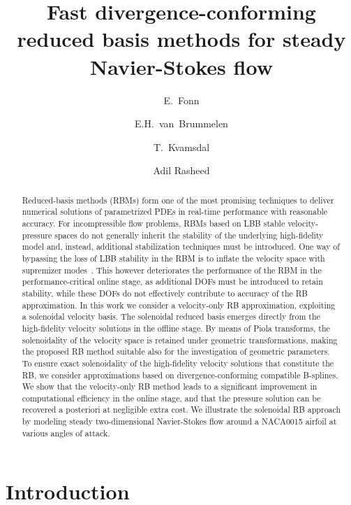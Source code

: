 \documentclass[onecolumn, twoside, a4paper, 11pt]{article}
\begin{document}
\title{Fast divergence-conforming reduced basis methods for steady Navier-Stokes flow}
\author[1]{E.~Fonn}
\author[2]{E.H.~van~Brummelen}
\author[1,3]{T.~Kvamsdal}
\author[1]{Adil Rasheed}

\maketitle

\begin{abstract}
  Reduced-basis methods (RBMs) form one of the most promising techniques to
  deliver numerical solutions of parametrized PDEs in real-time performance
  with reasonable accuracy. For incompressible flow problems, RBMs based on LBB
  stable velocity-pressure spaces do not generally inherit the stability
  of the underlying high-fidelity model and, instead, additional stabilization techniques
  must be introduced. One way of bypassing the loss of LBB stability in the RBM is to
  inflate the velocity space with supremizer modes~\cite{Ballarin2015ssp}. This however
  deteriorates the performance of the RBM in the performance-critical online stage, as
  additional DOFs must be introduced to retain stability, while these DOFs do not effectively
  contribute to accuracy of the RB approximation. In this work we consider a velocity-only
  RB approximation, exploiting a solenoidal velocity basis. The solenoidal reduced basis
  emerges directly from the high-fidelity velocity solutions in the offline stage. By means
  of Piola transforms, the solenoidality of the velocity space is retained under geometric
  transformations, making the proposed RB method suitable also for the investigation of
  geometric parameters. To ensure exact solenoidality of the high-fidelity velocity solutions
  that constitute the RB, we consider approximations based on divergence-conforming compatible
  B-splines. We show that the velocity-only RB method leads to a significant improvement in
  computational efficiency in the online stage, and that the pressure solution can be recovered
  a posteriori at negligible extra cost. We illustrate the solenoidal RB approach by modeling
  steady two-dimensional Navier-Stokes flow around a NACA0015 airfoil at various angles of attack.
\end{abstract}

\section{Introduction}
\end{document}
